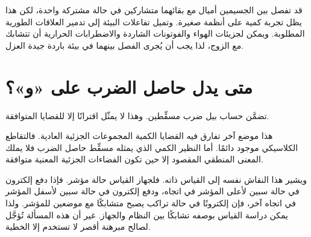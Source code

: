 قد تفصل بين الجسيمين أميال مع بقائهما متشاركين في حالة مشتركة واحدة، لكن هذا يظل تجربة كمية على أنظمة صغيرة. وتميل تفاعلات البيئة إلى تدمير العلاقات الطورية المطلوبة. ويمكن لجزيئات الهواء والفوتونات الشاردة والاضطرابات الحرارية أن تتشابك مع الزوج، لذا يجب أن يُجرى الفصل بينهما في بيئة باردة جيدة العزل.

\begin{classroomqa}
\end{classroomqa}

\begin{classroomqa}
\end{classroomqa}

\section{متى يدل حاصل الضرب على «و»؟}

تضمَّن حساب بيل ضرب مسقِّطين. وهذا لا يمثّل اقترانًا إلا للقضايا المتوافقة.

\begin{classroomqa}
\end{classroomqa}

هذا موضع آخر تفارق فيه القضايا الكمية المجموعات الجزئية العادية. فالتقاطع الكلاسيكي موجود دائمًا. أما النظير الكمي الذي يمثله مسقِّط حاصل الضرب فلا يملك المعنى المنطقي المقصود إلا حين تكون الفضاءات الجزئية المعنية متوافقة.

ويشير هذا النقاش نفسه إلى القياس ذاته. فلجهاز القياس حالة مؤشر. فإذا دفع إلكترون في حالة سبين لأعلى المؤشر في اتجاه، ودفع إلكترون في حالة سبين لأسفل المؤشر في اتجاه آخر، فإن إلكترونًا في حالة تراكب يصبح متشابكًا مع موضعين للمؤشر. ولذا يمكن دراسة القياس بوصفه تشابكًا بين النظام والجهاز. غير أن هذه المسألة تُؤجَّل لصالح مبرهنة أقصر لا تستخدم إلا الخطية.

